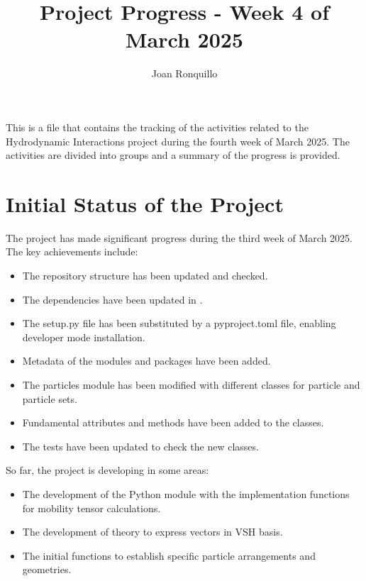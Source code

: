 \documentclass[12pt]{article}
\begin{document}
\author{Joan Ronquillo}

\title{Project Progress - Week 4 of March 2025}
\maketitle

This is a file that contains the tracking of the activities
related to the Hydrodynamic Interactions project during the
fourth week of March 2025. The activities are divided into
groups and a summary of the progress is provided.

\section{Initial Status of the Project}
The project has made significant progress during the third week of March 2025. The key achievements include:
\begin{itemize}
    \item The repository structure has been updated and checked.
    \item The dependencies have been updated in .
    \item The setup.py file has been substituted by a pyproject.toml file, enabling developer mode installation.
    \item Metadata of the modules and packages have been added.
    \item The particles module has been modified with different classes for particle and particle sets.
    \item Fundamental attributes and methods have been added to the classes.
    \item The tests have been updated to check the new classes.
\end{itemize}

So far, the project is developing in some areas:
\begin{itemize}
    \item The development of the Python module with the implementation functions for mobility tensor calculations.
    \item The development of theory to express vectors in VSH basis.
    \item The initial functions to establish specific particle arrangements and geometries.
\end{itemize}
\end{document}
